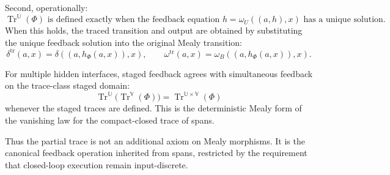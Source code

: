 Second, operationally:
\[
\boxed{
\operatorname{Tr}^{\mathbb U}(\Phi)
\text{ is defined exactly when the feedback equation }
h=\omega_U((a,h),x)
\text{ has a unique solution.}
}
\]
When this holds, the traced transition and output are obtained by substituting
the unique feedback solution into the original Mealy transition:
\[
\delta^{\operatorname{tr}}(a,x)
=
\delta((a,h_\Phi(a,x)),x),
\qquad
\omega^{\operatorname{tr}}(a,x)
=
\omega_B((a,h_\Phi(a,x)),x).
\]

For multiple hidden interfaces, staged feedback agrees with simultaneous
feedback on the trace-class staged domain:
\[
\operatorname{Tr}^{\mathbb U}
\bigl(\operatorname{Tr}^{\mathbb V}(\Phi)\bigr)
=
\operatorname{Tr}^{\mathbb U\times\mathbb V}(\Phi)
\]
whenever the staged traces are defined.  This is the deterministic Mealy form
of the vanishing law for the compact-closed trace of spans.

Thus the partial trace is not an additional axiom on Mealy morphisms.  It is
the canonical feedback operation inherited from spans, restricted by the
requirement that closed-loop execution remain input-discrete.